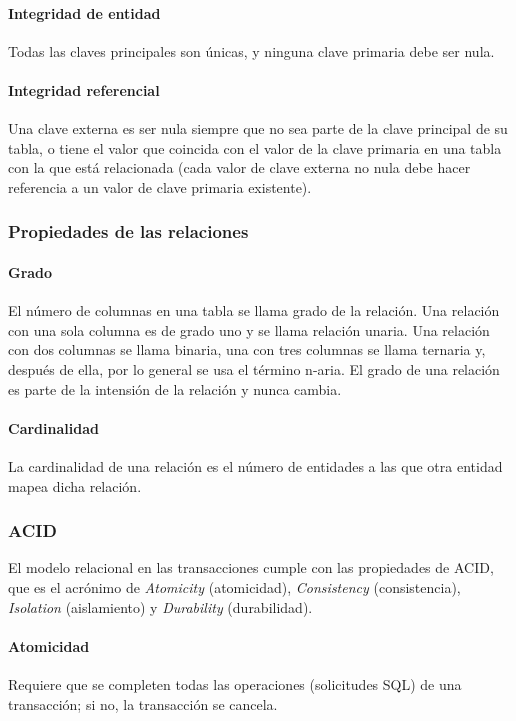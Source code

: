 \paragraph*{Integridad de entidad}
Todas las claves principales son únicas, y ninguna clave primaria debe ser nula.
\paragraph*{Integridad referencial}
Una clave externa es ser nula siempre que no sea parte de la clave principal de su tabla, o tiene el valor que coincida con el valor de la clave primaria en una tabla con la que está relacionada (cada valor de clave externa no nula debe hacer referencia a un valor de clave primaria existente).

\subsubsection{Propiedades de las relaciones}
\paragraph*{Grado}
El número de columnas en una tabla se llama grado de la relación. Una relación con una sola columna es de grado uno y se llama relación unaria. Una relación con dos columnas se llama binaria, una con tres columnas se llama ternaria y, después de ella, por lo general se usa el término n-aria. El grado de una relación es parte de la intensión de la relación y nunca cambia.


\paragraph*{Cardinalidad}
La cardinalidad de una relación es el número de entidades a las que otra entidad mapea dicha relación.

\subsubsection{ACID}
El modelo relacional en las transacciones cumple con las propiedades de ACID, que es el acrónimo de \textit{Atomicity} (atomicidad), \textit{Consistency} (consistencia), \textit{Isolation} (aislamiento) y \textit{Durability} (durabilidad). 

\paragraph*{Atomicidad}
Requiere que se completen todas las operaciones (solicitudes SQL) de una transacción; si no, la transacción se cancela. 


